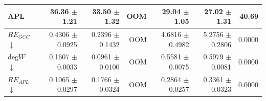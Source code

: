 \begin{table}[H]
\begin{tabular}{lrrrrrr}
APL                           & 36.36 $\pm$ 1.21 & 33.50 $\pm$ 1.32 & OOM & 29.04 $\pm$ 1.05 & 27.02 $\pm$ 1.31 & 40.69 \\
\midrule
$RE_{GCC}$ $\downarrow$       & 0.4306 $\pm$ 0.0925 & 0.2396 $\pm$ 0.1432 & OOM & 4.6816 $\pm$ 0.4982 & 5.2756 $\pm$ 0.2806 & 0.0000 \\
$\mathrm{deg}W$ $\downarrow$  & 0.1607 $\pm$ 0.0033 & 0.0961 $\pm$ 0.0100 & OOM & 0.5581 $\pm$ 0.0075 & 0.5979 $\pm$ 0.0081 & 0.0000 \\
$RE_{APL}$ $\downarrow$       & 0.1065 $\pm$ 0.0297 & 0.1766 $\pm$ 0.0324 & OOM & 0.2864 $\pm$ 0.0257 & 0.3361 $\pm$ 0.0323 & 0.0000 \\
\bottomrule
\end{tabular}
\end{table}
